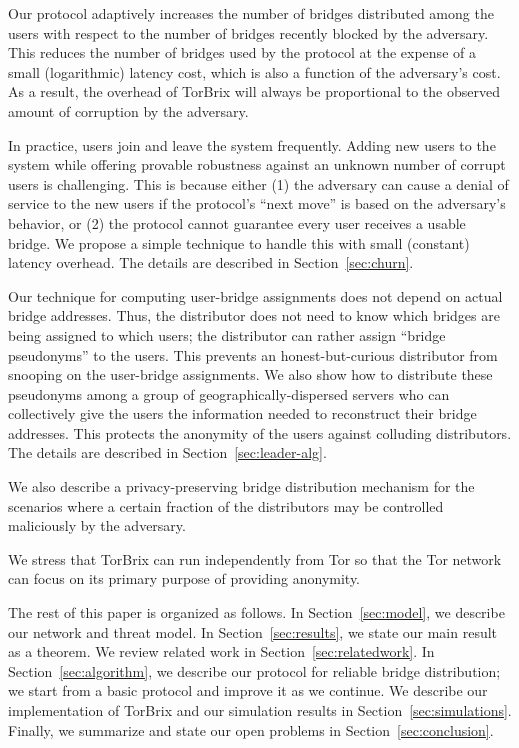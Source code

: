 \documentclass[letterpaper,twocolumn,10pt]{article}
\newcommand{\fullpaper}[1]{#1}
\newcommand{\fullpaper}[1]{}
\newcommand{\sfsize}{\fontsize{0.73\baselineskip}{0.73\baselineskip}\selectfont}
\newcommand{\sans}[1]{\textsf{\sfsize \mbox{#1}}}
\newcommand{\brix}{\sans{TorBrix}\xspace}
\begin{document}
Our protocol adaptively increases the number of bridges distributed among the users with respect to the number of bridges recently blocked by the adversary. This reduces the number of bridges used by the protocol at the expense of a small (logarithmic) latency cost, which is also a function of the adversary's cost. As a result, the overhead of \brix will always be proportional to the observed amount of corruption by the adversary.

In practice, users join and leave the system frequently. Adding new users to the system while offering provable robustness against an unknown number of corrupt users is challenging. This is because either (1) the adversary can cause a denial of service to the new users if the protocol's ``next move'' is based on the adversary's behavior, or (2) the protocol cannot guarantee every user receives a usable bridge. We propose a simple technique to handle this with small (constant) latency overhead. The details are described in Section~\ref{sec:churn}.

Our technique for computing user-bridge assignments does not depend on actual bridge addresses. Thus, \fullpaper{the distributor does not need to know which bridges are being assigned to which users;} the distributor can \fullpaper{rather} assign ``bridge pseudonyms'' to the users. This prevents an honest-but-curious distributor from snooping on the user-bridge assignments.
We also show how to distribute these pseudonyms among a group of geographically-dispersed servers who can collectively give the users the information needed to reconstruct their bridge addresses. This protects the anonymity of the users against colluding distributors. The details are described in Section~\ref{sec:leader-alg}.

We also describe a privacy-preserving bridge distribution mechanism for the scenarios where a certain fraction of the distributors may be controlled maliciously by the adversary. 

We stress that \brix can run independently from Tor so that the Tor network can focus on its primary purpose of providing anonymity.

The rest of this paper is organized as follows. In Section~\ref{sec:model}, we describe our network and threat model. In Section~\ref{sec:results}, we state our main result as a theorem. We review related work in Section~\ref{sec:relatedwork}. In Section~\ref{sec:algorithm}, we describe our protocol for reliable bridge distribution; we start from a basic protocol and improve it as we continue. We describe our implementation of \brix and our simulation results in Section~\ref{sec:simulations}. Finally, we summarize and state our open problems in Section~\ref{sec:conclusion}.
\end{document}
